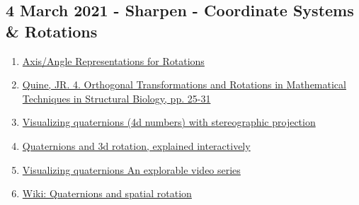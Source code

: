 \documentclass[11pt, oneside]{article}   	%
\begin{document}
\subsection{4 March 2021 - Sharpen - Coordinate Systems \& Rotations}
\begin{enumerate}
	\item \href{https://www.coursera.org/lecture/robotics-flight/axis-angle-representations-for-rotations-4hTtQ}{Axis/Angle Representations for Rotations}
	\item \href{https://accio.github.io/AMIDD/assets/2020/04/JRQuine-MathBiophysicsBook.pdf}{Quine, JR. 4. Orthogonal Transformations and Rotations in Mathematical Techniques in Structural Biology, pp. 25-31}
    	\item \href{https://youtu.be/d4EgbgTm0Bg}{Visualizing quaternions (4d numbers) with stereographic projection}
	\item \href{https://youtu.be/zjMuIxRvygQ}{Quaternions and 3d rotation, explained interactively}
	\item \href{https://eater.net/quaternions/}{Visualizing quaternions An explorable video series}
	\item \href{https://en.wikipedia.org/wiki/Quaternions_and_spatial_rotation}{Wiki: Quaternions and spatial rotation}
\end{enumerate}
\end{document}
